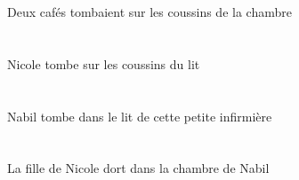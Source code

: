 \begin{exe}
Deux cafés tombaient sur les coussins de la chambre
\ex\glll
\INDSgAbs{}   \NicoleDSgAbs{}    \DEFPlObl{}    \DEFSgObl{}   \litDSgObl{}   \DE{}   \coussinAPlObl{}   \SUR{}  \tomberViPrsDSg{}\\
\INDSgAbsP{}   \NicoleDSgAbsP{}    \DEFPlOblP{}    \DEFSgOblP{}   \litDSgOblP{}   \DEP{}   \coussinAPlOblP{}   \SURP{}  \tomberViPrsDSgP{}\\
\INDSgAbsG{}   \NicoleDSgAbsG{}    \DEFPlOblG{}    \DEFSgOblG{}   \litDSgOblG{}   \DEG{}   \coussinAPlOblG{}   \SURG{}  \tomberViPrsDSgG{}\\
Nicole tombe sur les coussins du lit
\ex\glll
\INDSgAbs{}   \NabilBSgAbs{}    \DEFSgObl{}    \DEMSgObl{}   \petitBSg{}   \infirmiereBSgObl{}   \DE{}   \litDSgObl{}   \DANS{}  \tomberViPrsBSg{}\\
\INDSgAbsP{}   \NabilBSgAbsP{}    \DEFSgOblP{}    \DEMSgOblP{}   \petitBSgP{}   \infirmiereBSgOblP{}   \DEP{}   \litDSgOblP{}   \DANSP{}  \tomberViPrsBSgP{}\\
\INDSgAbsG{}   \NabilBSgAbsG{}    \DEFSgOblG{}    \DEMSgOblG{}   \petitBSgG{}   \infirmiereBSgOblG{}   \DEG{}   \litDSgOblG{}   \DANSG{}  \tomberViPrsBSgG{}\\
Nabil tombe dans le lit de cette petite infirmière
\ex\glll
\DEFSgAbs{}    \INDSgObl{}   \NicoleDSgObl{}   \DE{}   \filleCSgAbs{}    \DEFSgObl{}    \INDSgObl{}   \NabilBSgObl{}   \DE{}   \chambreBSgObl{}   \DANS{}  \dormirViPrsCSg{}\\
\DEFSgAbsP{}    \INDSgOblP{}   \NicoleDSgOblP{}   \DEP{}   \filleCSgAbsP{}    \DEFSgOblP{}    \INDSgOblP{}   \NabilBSgOblP{}   \DEP{}   \chambreBSgOblP{}   \DANSP{}  \dormirViPrsCSgP{}\\
\DEFSgAbsG{}    \INDSgOblG{}   \NicoleDSgOblG{}   \DEG{}   \filleCSgAbsG{}    \DEFSgOblG{}    \INDSgOblG{}   \NabilBSgOblG{}   \DEG{}   \chambreBSgOblG{}   \DANSG{}  \dormirViPrsCSgG{}\\
La fille de Nicole dort dans la chambre de Nabil
\ex\glll
\DEFPlErg{}   \infirmiereBPlErg{}    \DEFDuDat{}    \INDPlObl{}   \sourisAPlObl{}   \DE{}   \chasseurCDuDat{}   \INDSgAbs{}   \cafeDSgAbs{}  \offrirVdPstDSg{}\\
\DEFPlErgP{}   \infirmiereBPlErgP{}    \DEFDuDatP{}    \INDPlOblP{}   \sourisAPlOblP{}   \DEP{}   \chasseurCDuDatP{}   \INDSgAbsP{}   \cafeDSgAbsP{}  \offrirVdPstDSgP{}\\
\DEFPlErgG{}   \infirmiereBPlErgG{}    \DEFDuDatG{}    \INDPlOblG{}   \sourisAPlOblG{}   \DEG{}   \chasseurCDuDatG{}   \INDSgAbsG{}   \cafeDSgAbsG{}  \offrirVdPstDSgG{}\\

\end{exe}
